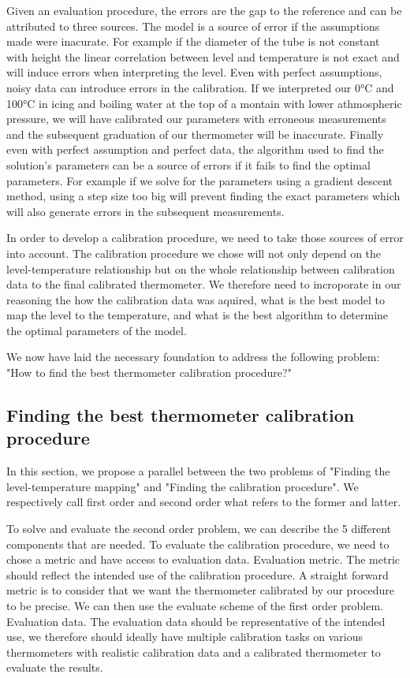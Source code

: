 \begin{bibunit}
Given an evaluation procedure, the errors are the gap to the reference and can be attributed to three sources.
 The model is a source of error if the assumptions made were inacurate. For example if the diameter of the tube is not constant with height the linear correlation between level and temperature is not exact and will induce errors when interpreting the level.
 Even with perfect assumptions, noisy data can introduce errors in the calibration. If we interpreted our 0°C and 100°C in icing and boiling water at the top of a montain with lower athmospheric pressure, we will have calibrated our parameters with erroneous measurements and the subsequent graduation of our thermometer will be inaccurate.
 Finally even with perfect assumption and perfect data, the algorithm used to find the solution's parameters can be a source of errors if it fails to find the optimal parameters. For example if we solve for the parameters using a gradient descent method, using a step size too big will prevent finding the exact parameters which will also generate errors in the subsequent measurements.


In order to develop a calibration procedure, we need to take those sources of error into account. The calibration procedure we chose will not only depend on the level-temperature relationship but on the whole relationship between calibration data to the final calibrated thermometer. We therefore need to incroporate in our reasoning the how the calibration data was aquired, what is the best model to map the level to the temperature, and what is the best algorithm to determine the optimal parameters of the model.

We now have laid the necessary foundation to address the following problem: "How to find the best thermometer calibration procedure?"

\subsection{Finding the best thermometer calibration procedure}

In this section, we propose a parallel between the two problems of "Finding the level-temperature mapping" and  "Finding the calibration procedure". We respectively call first order and second order what refers to the former and latter.

To solve and evaluate the second order problem, we can describe the 5 different components that are needed.
To evaluate the calibration procedure, we need to chose a metric and have access to evaluation data.
Evaluation metric. The metric should reflect the intended use of the calibration procedure. A straight forward metric is to consider that we want the thermometer calibrated by our procedure to be precise. We can then use the evaluate scheme of the first order problem.
Evaluation data. The evaluation data should be representative of the intended use, we therefore should ideally have multiple calibration tasks on various thermometers with realistic calibration data and a calibrated thermometer to evaluate the results.


\end{bibunit}
